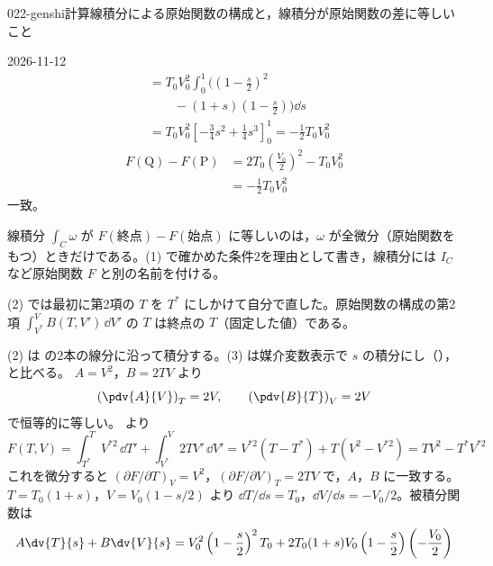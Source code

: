 \documentclass[uplatex,dvipdfmx,a4paper,11pt]{jsarticle}
\begin{document}
\begin{mondai}{022-genshi}{計算}{線積分による原始関数の構成と，線積分が原始関数の差に等しいこと}
\begin{kotaeutsushi}{2026-11-12}
\begin{align*}
&=T_{0}V_{0}^{2}\int_{0}^{1}\biggl(\left(1-\frac{s}{2}\right)^{2}\\
&\qquad-(1+s)\left(1-\frac{s}{2}\right)\biggr)\dd s\\
&=T_{0}V_{0}^{2}\left[-\frac{3}{4}s^{2}+\frac{1}{4}s^{3}\right]_{0}^{1}=-\frac{1}{2}T_{0}V_{0}^{2}
\end{align*}
\begin{align*}
F(\mathrm{Q})-F(\mathrm{P})&=2T_{0}\left(\frac{V_{0}}{2}\right)^{2}-T_{0}V_{0}^{2}\\
&=-\frac{1}{2}T_{0}V_{0}^{2}
\end{align*}
一致。
\end{kotaeutsushi}
\begin{kizuki}
\item 線積分 $\int_{C}\omega$ が $F(\text{終点})-F(\text{始点})$ に等しいのは，$\omega$ が全微分（原始関数をもつ）ときだけである。(1) で確かめた条件2を理由として書き，線積分には $I_{C}$ など原始関数 $F$ と別の名前を付ける。
\item (2) では最初に第2項の $T$ を $T^{*}$ にしかけて自分で直した。原始関数の構成の第2項 $\int_{V^{*}}^{V}B(T,V')\,\dd V'$ の $T$ は終点の $T$（固定した値）である。
\end{kizuki}
\begin{tadashii}
\houshin (2) は  の2本の線分に沿って積分する。(3) は媒介変数表示で $s$ の積分にし（）， と比べる。
\keisan {} $A = V^{2}$，$B = 2TV$ より
\[ \left(\pdv{A}{V}\right)_{T} = 2V, \qquad \left(\pdv{B}{T}\right)_{V} = 2V \]
で恒等的に等しい。
  より
\[ F(T,V) = \int_{T^{*}}^{T} V^{*2}\,\dd T' + \int_{V^{*}}^{V} 2TV'\,\dd V' = V^{*2}(T - T^{*}) + T(V^{2} - V^{*2}) = TV^{2} - T^{*}V^{*2} \]
これを微分すると $(\partial F/\partial T)_{V} = V^{2}$，$(\partial F/\partial V)_{T} = 2TV$ で，$A$，$B$ に一致する。
 $T = T_{0}(1+s)$，$V = V_{0}(1 - s/2)$ より $\dd T/\dd s = T_{0}$，$\dd V/\dd s = -V_{0}/2$。被積分関数は
\begin{align*}
A\dv{T}{s} + B\dv{V}{s} &= V_{0}^{2}\left(1 - \frac{s}{2}\right)^{2}T_{0} + 2T_{0}(1+s)V_{0}\left(1 - \frac{s}{2}\right)\left(-\frac{V_{0}}{2}\right)\\

\end{align*}
\end{tadashii}
\end{mondai}
\end{document}
